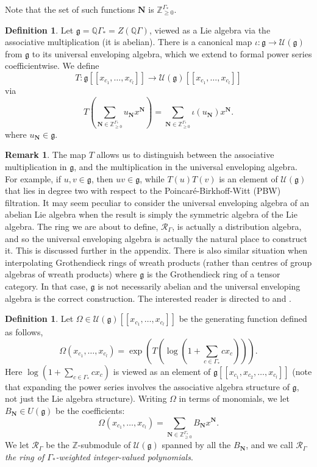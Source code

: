 \documentclass[10pt]{article}
\theoremstyle{definition}
\newtheorem{definition}[theorem]{Definition}
\newtheorem{remark}[theorem]{Remark}
\newcommand{\RGamma}{\mathcal{R}_{\Gamma}}
\begin{document}
Note that the set of such functions $\mathbf{N}$ is $\mathbb{Z}_{\geq 0}^{\Gamma_*}$. 
\begin{definition}
Let $\mathfrak{g} = \mathbb{Q}\Gamma_* = Z(\mathbb{Q}\Gamma)$, viewed as a Lie algebra via the associative multiplication \textup{(}it is abelian\textup{)}. There is a canonical map $\iota: \mathfrak{g} \to \mathcal{U}(\mathfrak{g})$ from $\mathfrak{g}$ to its universal enveloping algebra, which we extend to formal power series coefficientwise. We define
\[
T: \mathfrak{g}[[x_{c_1}, \ldots, x_{c_l}]] \to \mathcal{U}(\mathfrak{g})[[x_{c_1},  \ldots, x_{c_l}]]
\]
via
\[
T\left(
\sum_{\mathbf{N} \in \mathbb{Z}_{\geq 0}^{\Gamma_*}} u_{\mathbf{N}} x^{\mathbf{N}}
\right) = \sum_{\mathbf{N} \in \mathbb{Z}_{\geq 0}^{\Gamma_*}} \iota(u_{\mathbf{N}}) x^{\mathbf{N}}.
\]
where $u_{\mathbf{N}} \in \mathfrak{g}$.
\end{definition}
\begin{remark}
The map $T$ allows us to distinguish between the associative multiplication in $\mathfrak{g}$, and the multiplication in the universal enveloping algebra. For example, if $u, v \in \mathfrak{g}$, then $uv \in \mathfrak{g}$, while $T(u)T(v)$ is an element of $\mathcal{U}(\mathfrak{g})$ that lies in degree two with respect to the Poincar\'{e}-Birkhoff-Witt (PBW) filtration. It may seem peculiar to consider the universal enveloping algebra of an abelian Lie algebra when the result is simply the symmetric algebra of the Lie algebra. The ring we are about to define, $\RGamma$, is actually a distribution algebra, and so the universal enveloping algebra is actually the natural place to construct it. This is discussed further in the appendix. There is also similar situation when interpolating Grothendieck rings of wreath products (rather than centres of group algebras of wreath products) where $\mathfrak{g}$ is the Grothendieck ring of a tensor category. In that case, $\mathfrak{g}$ is not necessarily abelian and the universal enveloping algebra is the correct construction. The interested reader is directed to \cite{Ryba1} and \cite{Ryba2}.
\end{remark}
\begin{definition} \label{rgamma_constr_defn}
Let $\Omega \in \mathcal{U}(\mathfrak{g})[[x_{c_1}, \ldots, x_{c_l}]]$ be the generating function defined as follows,
\[
\Omega(x_{c_1}, \ldots, x_{c_l}) = \exp\left(T\left(\log\left(1 + \sum_{c \in \Gamma_*} c x_c\right)\right)\right).
\]
Here $\log\left(1 + \sum_{c \in \Gamma_*} c x_c\right)$ is viewed as an element of $\mathfrak{g}[[x_{c_1}, x_{c_2}, \ldots, x_{c_l}]]$ \textup{(}note that expanding the power series involves the associative algebra structure of $\mathfrak{g}$, not just the Lie algebra structure\textup{)}. Writing $\Omega$ in terms of monomials, we let $B_{\mathbf{N}} \in U(\mathfrak{g})$ be the coefficients:
\[
\Omega(x_{c_1}, \ldots, x_{c_l}) = \sum_{\mathbf{N} \in \mathbb{Z}_{\geq 0}^{\Gamma_*}} B_{\mathbf{N}} x^{\mathbf{N}}.
\]
We let $\RGamma$ be the $\mathbb{Z}$-submodule of $\mathcal{U}(\mathfrak{g})$ spanned by all the $B_{\mathbf{N}}$, and we call $\RGamma$ \emph{the ring of $\Gamma_*$-weighted integer-valued polynomials}.
\end{definition}
\end{document}
